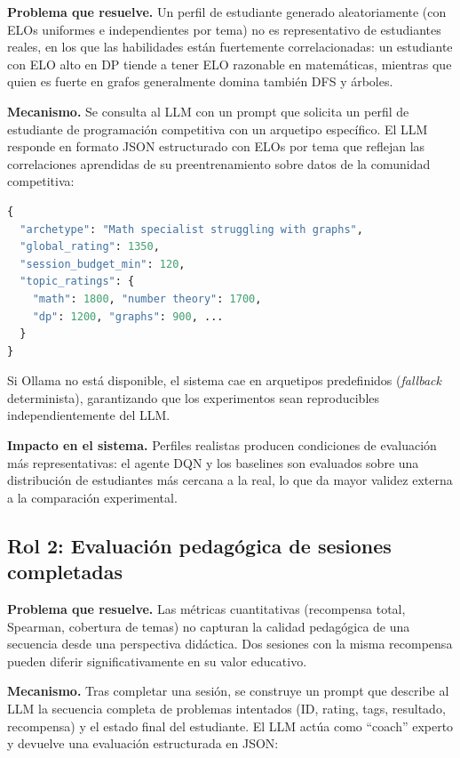 \documentclass[12pt, a4paper]{article}
\begin{document}
\textbf{Problema que resuelve.}
Un perfil de estudiante generado aleatoriamente (con ELOs uniformes e
independientes por tema) no es representativo de estudiantes reales, en
los que las habilidades están fuertemente correlacionadas: un estudiante con ELO
alto en DP tiende a tener ELO razonable en matemáticas, mientras que quien es
fuerte en grafos generalmente domina también DFS y árboles.

\textbf{Mecanismo.}
Se consulta al LLM con un prompt que solicita un perfil de estudiante de
programación competitiva con un arquetipo específico. El LLM responde en
formato JSON estructurado con ELOs por tema que reflejan las correlaciones
aprendidas de su preentrenamiento sobre datos de la comunidad competitiva:

\begin{lstlisting}[language=Python, caption=Estructura del perfil generado por el LLM]
{
  "archetype": "Math specialist struggling with graphs",
  "global_rating": 1350,
  "session_budget_min": 120,
  "topic_ratings": {
    "math": 1800, "number theory": 1700,
    "dp": 1200, "graphs": 900, ...
  }
}
\end{lstlisting}

Si Ollama no está disponible, el sistema cae en arquetipos predefinidos
(\textit{fallback} determinista), garantizando que los experimentos sean
reproducibles independientemente del LLM.

\textbf{Impacto en el sistema.}
Perfiles realistas producen condiciones de evaluación más representativas:
el agente DQN y los baselines son evaluados sobre una distribución de
estudiantes más cercana a la real, lo que da mayor validez externa a la
comparación experimental.

\subsection{Rol 2: Evaluación pedagógica de sesiones completadas}

\textbf{Problema que resuelve.}
Las métricas cuantitativas (recompensa total, Spearman, cobertura de temas)
no capturan la calidad pedagógica de una secuencia desde una perspectiva
didáctica. Dos sesiones con la misma recompensa pueden diferir
significativamente en su valor educativo.

\textbf{Mecanismo.}
Tras completar una sesión, se construye un prompt que describe al LLM la
secuencia completa de problemas intentados (ID, rating, tags, resultado,
recompensa) y el estado final del estudiante. El LLM actúa como ``coach''
experto y devuelve una evaluación estructurada en JSON:
\end{document}
